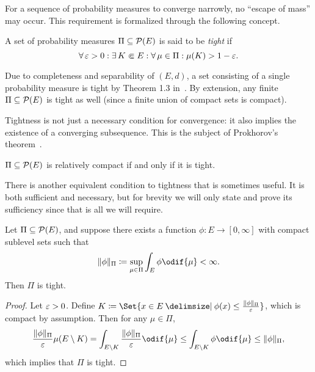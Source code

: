 For a sequence of probability measures to converge narrowly, no \enquote{escape of mass} may occur.
This requirement is formalized through the following concept.

\begin{definition}
  A set of probability measures \( \Pi \subseteq \mathcal{P}(E) \) is said to be \textit{tight} if
  \begin{equation}
    \forall \eps > 0 : \exists K \Subset E : \forall \mu \in \Pi : \mu(K) > 1 - \eps.
  \end{equation}
\end{definition}

Due to completeness and separability of \((E,d)\), a set consisting of a single probability measure is tight by Theorem 1.3 in~\cite{billingsleyConvergenceProbabilityMeasures1999}.
By extension, any finite \(\Pi \subseteq \mathcal{P}(E)\) is tight as well (since a finite union of compact sets is compact).

Tightness is not just a necessary condition for convergence: it also implies the existence of a converging subsequence.
This is the subject of Prokhorov's theorem~\cite[57-65]{billingsleyConvergenceProbabilityMeasures1999}.

\begin{theorem}[Prokhorov]\label{thm:prokhorov}
  \( \Pi \subseteq \mathcal{P}(E) \) is relatively compact if and only if it is tight.
\end{theorem}

There is another equivalent condition to tightness that is sometimes useful.
It is both sufficient and necessary, but for brevity we will only state and prove its sufficiency since that is all we will require.

\begin{lemma}\label{lem:tightness-char-coercive-function}
  Let \( \Pi \subseteq \mathcal{P}(E) \), and suppose there exists a function \( \phi : E \to [0,\infty] \) with compact sublevel sets such that
  \begin{equation}
    \norm{\phi}_\Pi \coloneqq \sup_{\mu \in \Pi} \int_E \phi \odif{\mu} < \infty.
  \end{equation}
  Then \( \Pi \) is tight.
\end{lemma}

\begin{proof}
  Let \( \varepsilon > 0 \).
  Define \( K \coloneqq \Set{x \in E \given \phi(x) \leq \frac{\norm{\phi}_\Pi}{\eps}} \), which is compact by assumption.
  Then for any \( \mu \in \Pi \),
  \begin{equation}
    \frac{\norm{\phi}_\Pi}{\eps} \mu(E \setminus K) = \int_{E \setminus K} \frac{\norm{\phi}_\Pi}{\eps} \odif{\mu}
    \leq \int_{E \setminus K} \phi \odif{\mu}
    \leq \norm{\phi}_\Pi,
  \end{equation}
  which implies that \( \Pi \) is tight.
\end{proof}

